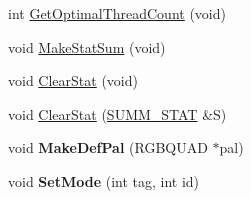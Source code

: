 \begin{DoxyCompactItemize}
$$\item 
int \hyperlink{class_c_v_i_engine_base_a1e0174d46d3d28931a648e0437f0686d}{Get\+Optimal\+Thread\+Count} (void)
\item 
void \hyperlink{class_c_v_i_engine_base_a2b86bf7f377f62e7a701fb3466708d04}{Make\+Stat\+Sum} (void)
\item 
void \hyperlink{class_c_v_i_engine_base_a10d6138a2c8f4c4c946bf930c268be6b}{Clear\+Stat} (void)
\item 
void \hyperlink{class_c_v_i_engine_base_adb910c0d7f06cf1f3ea7b2347aed1751}{Clear\+Stat} (\hyperlink{class_s_u_m_m___s_t_a_t}{S\+U\+M\+M\+\_\+\+S\+T\+A\+T} \&S)
\item 
\hypertarget{class_c_v_i_engine_base_a96dd47cc32f324e133644e7f823507ad}{void {\bfseries Make\+Def\+Pal} (R\+G\+B\+Q\+U\+A\+D $\ast$pal)}\label{class_c_v_i_engine_base_a96dd47cc32f324e133644e7f823507ad}

\item 
\hypertarget{class_c_v_i_engine_base_a22ba2d068df7651b957bb7cb00a324be}{void {\bfseries Set\+Mode} (int tag, int id)}\label{class_c_v_i_engine_base_a22ba2d068df7651b957bb7cb00a324be}


\end{DoxyCompactItemize}
